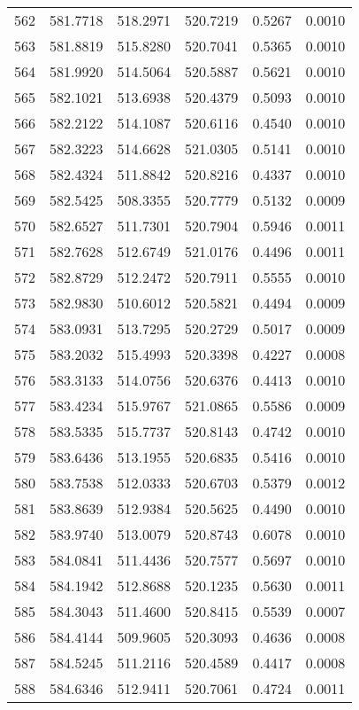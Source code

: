 \documentclass{article}
\begin{document}
\begin{longtable}{|c|c|c|c|c|c|}
562 & 581.7718 & 518.2971 & 520.7219 & 0.5267 & 0.0010 \\
563 & 581.8819 & 515.8280 & 520.7041 & 0.5365 & 0.0010 \\
564 & 581.9920 & 514.5064 & 520.5887 & 0.5621 & 0.0010 \\
565 & 582.1021 & 513.6938 & 520.4379 & 0.5093 & 0.0010 \\
566 & 582.2122 & 514.1087 & 520.6116 & 0.4540 & 0.0010 \\
567 & 582.3223 & 514.6628 & 521.0305 & 0.5141 & 0.0010 \\
568 & 582.4324 & 511.8842 & 520.8216 & 0.4337 & 0.0010 \\
569 & 582.5425 & 508.3355 & 520.7779 & 0.5132 & 0.0009 \\
570 & 582.6527 & 511.7301 & 520.7904 & 0.5946 & 0.0011 \\
571 & 582.7628 & 512.6749 & 521.0176 & 0.4496 & 0.0011 \\
572 & 582.8729 & 512.2472 & 520.7911 & 0.5555 & 0.0010 \\
573 & 582.9830 & 510.6012 & 520.5821 & 0.4494 & 0.0009 \\
574 & 583.0931 & 513.7295 & 520.2729 & 0.5017 & 0.0009 \\
575 & 583.2032 & 515.4993 & 520.3398 & 0.4227 & 0.0008 \\
576 & 583.3133 & 514.0756 & 520.6376 & 0.4413 & 0.0010 \\
577 & 583.4234 & 515.9767 & 521.0865 & 0.5586 & 0.0009 \\
578 & 583.5335 & 515.7737 & 520.8143 & 0.4742 & 0.0010 \\
579 & 583.6436 & 513.1955 & 520.6835 & 0.5416 & 0.0010 \\
580 & 583.7538 & 512.0333 & 520.6703 & 0.5379 & 0.0012 \\
581 & 583.8639 & 512.9384 & 520.5625 & 0.4490 & 0.0010 \\
582 & 583.9740 & 513.0079 & 520.8743 & 0.6078 & 0.0010 \\
583 & 584.0841 & 511.4436 & 520.7577 & 0.5697 & 0.0010 \\
584 & 584.1942 & 512.8688 & 520.1235 & 0.5630 & 0.0011 \\
585 & 584.3043 & 511.4600 & 520.8415 & 0.5539 & 0.0007 \\
586 & 584.4144 & 509.9605 & 520.3093 & 0.4636 & 0.0008 \\
587 & 584.5245 & 511.2116 & 520.4589 & 0.4417 & 0.0008 \\
588 & 584.6346 & 512.9411 & 520.7061 & 0.4724 & 0.0011 \\

\end{longtable}
\end{document}
